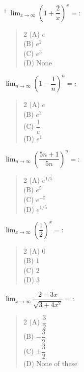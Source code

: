 \documentclass[11pt,a4paper]{article}
\begin{document}
\begin{mcqlist}
\item $^{\dagger}$ $\displaystyle\lim_{x\to\infty}\left(1+\dfrac{2}{x}\right)^{x} = $:
\begin{quote}\begin{multicols}{2}
\noindent (A) $e$ \\
(B) $e^2$ \\
(C) $e^3$ \\
(D) None
\end{multicols}\end{quote}

\item $\displaystyle\lim_{n\to\infty}\left(1-\dfrac{1}{n}\right)^{n} = $:
\begin{quote}\begin{multicols}{2}
\noindent (A) $e$ \\
(B) $e^2$ \\
(C) $\dfrac{1}{e}$ \\
(D) $e^1$
\end{multicols}\end{quote}

\item $\displaystyle\lim_{n\to\infty}\left(\dfrac{5n+1}{5n}\right)^{n} = $:
\begin{quote}\begin{multicols}{2}
\noindent (A) $e^{1/5}$ \\
(B) $e^5$ \\
(C) $e^{-5}$ \\
(D) $e^{1/5}$
\end{multicols}\end{quote}

\item $\displaystyle\lim_{x\to\infty}\left(\dfrac{1}{2}\right)^{x} = $:
\begin{quote}\begin{multicols}{2}
\noindent (A) $0$ \\
(B) $1$ \\
(C) $2$ \\
(D) $3$
\end{multicols}\end{quote}

\item $\displaystyle\lim_{x\to\infty}\dfrac{2-3x}{\sqrt{3+4x^2}} = $:
\begin{quote}\begin{multicols}{2}
\noindent (A) $\dfrac{3}{2}$ \\
(B) $-\dfrac{3}{2}$ \\
(C) $\pm\dfrac{3}{2}$ \\
(D) None of these
\end{multicols}\end{quote}


\end{mcqlist}
\end{document}
